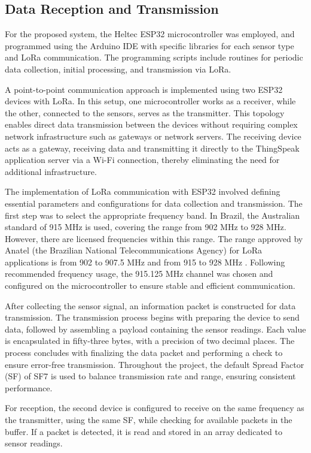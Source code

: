 \subsection{Data Reception and Transmission}

For the proposed system, the Heltec ESP32 microcontroller was employed, and programmed using the Arduino IDE with specific libraries for each sensor type and LoRa communication. The programming scripts include routines for periodic data collection, initial processing, and transmission via LoRa.

A point-to-point communication approach is implemented using two ESP32 devices with LoRa. In this setup, one microcontroller works as a receiver, while the other, connected to the sensors, serves as the transmitter. This topology enables direct data transmission between the devices without requiring complex network infrastructure such as gateways or network servers. The receiving device acts as a gateway, receiving data and transmitting it directly to the ThingSpeak application server via a Wi-Fi connection, thereby eliminating the need for additional infrastructure.

The implementation of LoRa communication with ESP32 involved defining essential parameters and configurations for data collection and transmission. The first step was to select the appropriate frequency band. In Brazil, the Australian standard of 915 MHz is used, covering the range from 902 MHz to 928 MHz. However, there are licensed frequencies within this range. The range approved by Anatel (the Brazilian National Telecommunications Agency) for LoRa applications is from 902 to 907.5 MHz and from 915 to 928 MHz  \cite{pastorio20212}. Following  recommended frequency usage, the 915.125 MHz channel was chosen and configured on the microcontroller to ensure stable and efficient communication.


After collecting the sensor signal, an information packet is constructed for data transmission. The transmission process begins with preparing the device to send data, followed by assembling a payload containing the sensor readings. Each value is encapsulated in fifty-three bytes, with a precision of two decimal places. The process concludes with finalizing the data packet and performing a check to ensure error-free transmission. Throughout the project, the default Spread Factor (SF) of SF7 is used to balance transmission rate and range, ensuring consistent performance.

For reception, the second device is configured to receive on the same frequency as the transmitter, using the same SF, while checking for available packets in the buffer. If a packet is detected, it is read and stored in an array dedicated to sensor readings.

